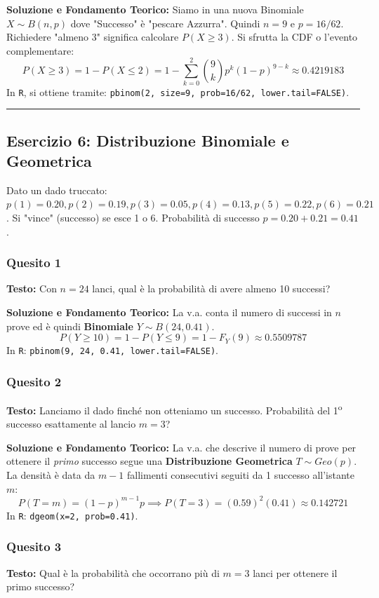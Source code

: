 \documentclass[12pt, a4paper]{article}
\begin{document}
\textbf{Soluzione e Fondamento Teorico:} 
Siamo in una nuova Binomiale $X \sim B(n,p)$ dove "Successo" è "pescare Azzurra". Quindi $n=9$ e $p=16/62$.
Richiedere "almeno 3" significa calcolare $P(X \ge 3)$. Si sfrutta la CDF o l'evento complementare:
$$ P(X \ge 3) = 1 - P(X \le 2) = 1 - \sum_{k=0}^{2} \binom{9}{k} p^k (1-p)^{9-k} \approx 0.4219183 $$
In \texttt{R}, si ottiene tramite: \texttt{pbinom(2, size=9, prob=16/62, lower.tail=FALSE)}.

\vspace{0.5cm}\hrule\vspace{0.5cm}

\subsection*{Esercizio 6: Distribuzione Binomiale e Geometrica}
Dato un dado truccato: $p(1)=0.20, p(2)=0.19, p(3)=0.05, p(4)=0.13, p(5)=0.22, p(6)=0.21$. 
Si "vince" (successo) se esce 1 o 6. Probabilità di successo $p = 0.20 + 0.21 = 0.41$.

\subsubsection*{Quesito 1}
\textbf{Testo:} Con $n=24$ lanci, qual è la probabilità di avere almeno 10 successi?

\textbf{Soluzione e Fondamento Teorico:} 
La v.a. conta il numero di successi in $n$ prove ed è quindi \textbf{Binomiale} $Y \sim B(24, 0.41)$.
$$ P(Y \ge 10) = 1 - P(Y \le 9) = 1 - F_Y(9) \approx 0.5509787 $$
In \texttt{R}: \texttt{pbinom(9, 24, 0.41, lower.tail=FALSE)}.

\subsubsection*{Quesito 2}
\textbf{Testo:} Lanciamo il dado finché non otteniamo un successo. Probabilità del 1\textsuperscript{o} successo esattamente al lancio $m=3$?

\textbf{Soluzione e Fondamento Teorico:} 
La v.a. che descrive il numero di prove per ottenere il \textit{primo} successo segue una \textbf{Distribuzione Geometrica} $T \sim Geo(p)$.
La densità è data da $m-1$ fallimenti consecutivi seguiti da 1 successo all'istante $m$:
$$ P(T=m) = (1-p)^{m-1} p \implies P(T=3) = (0.59)^2 (0.41) \approx 0.142721 $$
In \texttt{R}: \texttt{dgeom(x=2, prob=0.41)}.

\subsubsection*{Quesito 3}
\textbf{Testo:} Qual è la probabilità che occorrano più di $m=3$ lanci per ottenere il primo successo?
\end{document}
